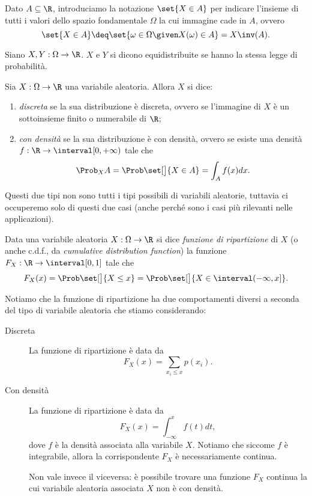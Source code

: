 Dato $A \subseteq \R$, introduciamo la notazione $\set{X \in A}$ per indicare l'insieme di tutti i valori dello spazio fondamentale $\Omega$ la cui immagine cade in $A$, ovvero \[
    \set{X \in A} \deq \set{\omega \in \Omega \given X(\omega) \in A} = X\inv(A).    
\] 

\begin{definition}
     Siano $X, Y : \Omega \to \R$. $X$ e $Y$ si dicono equidistribuite se hanno la stessa legge di probabilità.
\end{definition}

\begin{definition}
     Sia $X : \Omega \to \R$ una variabile aleatoria. Allora $X$ si dice: \begin{enumerate}
        \item \emph{discreta} se la sua distribuzione è discreta, ovvero se l'immagine di $X$ è un sottoinsieme finito o numerabile di $\R$;
        \item \emph{con densità} se la sua distribuzione è con densità, ovvero se esiste una densità $f : \R \to \interval[{0, +\infty})$ tale che \[
            \Prob_{X}{A} = \Prob\set[\big]{X \in A} = \int_A f(x)dx.    
        \]
    \end{enumerate}
\end{definition}

Questi due tipi non sono tutti i tipi possibili di variabili aleatorie, tuttavia ci occuperemo solo di questi due casi (anche perché sono i casi più rilevanti nelle applicazioni).

\begin{definition}
    Data una variabile aleatoria $X : \Omega \to \R$ si dice \emph{funzione di ripartizione} di $X$ (o anche c.d.f., da \emph{cumulative distribution function}) la funzione $F_{X} : \R \to \interval[{0,1}]$ tale che \[
        F_{X}(x) = \Prob\set[\big]{X \leq x} = \Prob\set[\big]{X \in \interval({-\infty, x}]}.   
    \]
\end{definition}

Notiamo che la funzione di ripartizione ha due comportamenti diversi a seconda del tipo di variabile aleatoria che stiamo considerando: \begin{description}
    \item[Discreta] La funzione di ripartizione è data da \[
        F_X(x) = \sum_{x_i \leq x} p(x_i).    
    \]
    \item[Con densità] La funzione di ripartizione è data da \[
        F_X(x) = \int_{-\infty}^x f(t)dt,   
    \] dove $f$ è la densità associata alla variabile $X$.
    Notiamo che siccome $f$ è integrabile, allora la corrispondente $F_X$ è necessariamente continua.

    Non vale invece il viceversa: è possibile trovare una funzione $F_X$ continua la cui variabile aleatoria associata $X$ non è con densità.
\end{description}

